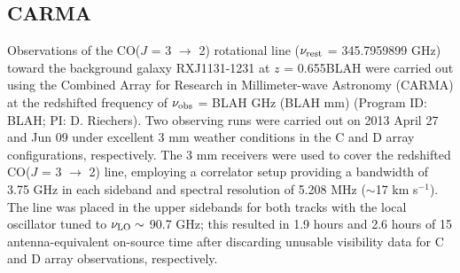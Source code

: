 \documentclass[]{emulateapj}
\begin{document}
\subsection{CARMA} \label{sec:carmadata}
Observations of the CO($J$ = 3 $\rightarrow$ 2) rotational line ($\nu_{\rm rest}$ = 345.7959899 GHz) toward the background galaxy RXJ1131-1231 at $z$ = 
0.655BLAH 
 were carried out using the Combined Array for Research in Millimeter-wave Astronomy (CARMA) at the redshifted frequency of $\nu_{\rm obs}$ = BLAH GHz (BLAH mm) (Program ID: BLAH; PI: D. Riechers).
Two observing runs were carried out on 2013 April 27 and Jun 09 under excellent 3 mm weather conditions in the C and D array configurations, respectively. The 3 mm receivers were used to cover the redshifted CO($J$ = 3 $\rightarrow$ 2) line, employing a correlator setup providing a bandwidth of 3.75 GHz in each sideband and spectral resolution of 5.208 MHz ($\sim$17 km s$^{-1}$). The line was placed in the
upper sidebands for both tracks with the local oscillator tuned to $\nu_{\rm LO}\sim$ 90.7 GHz; this resulted in 1.9 hours and 2.6 hours of 15 antenna-equivalent on-source time after discarding unusable visibility data for C and D array observations, respectively.
\end{document}
